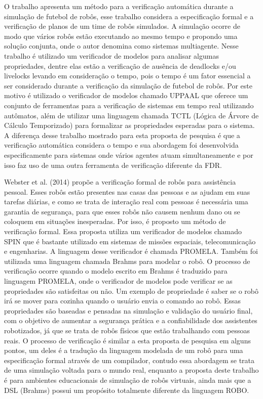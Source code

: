 O trabalho \cite{silva} apresenta um método para a verificação automática durante a simulação de futebol de robôs, esse trabalho considera a especificação formal e a verificação de planos de um time de robôs simulados. A simulação ocorre de modo que vários robôs estão executando ao mesmo tempo e propondo uma solução conjunta, onde o autor denomina como sistemas multiagente. Nesse trabalho é utilizado um verificador de modelos para analisar algumas propriedades, dentre elas estão a verificação de ausência de deadlocks e/ou livelocks levando em consideração o tempo, pois o tempo é um fator essencial a ser considerado durante a verificação da simulação de futebol de robôs.  Por este motivo é utilizado o verificador de modelos chamado UPPAAL que oferece um conjunto de ferramentas para a verificação de sistemas em tempo real utilizando autômatos, além de utilizar uma linguagem chamada TCTL (Lógica de Árvore de Cálculo Temporizado) para formalizar as propriedades esperadas para o sistema. A diferença desse trabalho mostrado para esta proposta de pesquisa é que a verificação automática considera o tempo e sua abordagem foi desenvolvida especificamente para sistemas onde vários agentes atuam simultaneamente e por isso faz uso de uma outra ferramenta de verificação diferente da FDR.
	
Webster et al. (2014) propõe a verificação formal de robôs para assistência pessoal. Esses robôs estão presentes nas casas das pessoas e as ajudam em suas tarefas diárias, e como se trata de interação real com pessoas é necessária uma garantia de segurança, para que esses robôs não causem nenhum dano ou se coloquem em situações inesperadas. Por isso, é proposto um método de verificação formal. Essa proposta utiliza um verificador de modelos chamado SPIN que é bastante utilizado em sistemas de missões espaciais, telecomunicação e engenharias. A linguagem desse verificador é chamada PROMELA. Também foi utilizada uma linguagem chamada Brahms para modelar o robô. O processo de verificação ocorre quando o modelo escrito em Brahms é traduzido para linguagem PROMELA, onde o verificador de modelos pode verificar se as propriedades são satisfeitas ou não. Um exemplo de propriedade é saber se o robô irá se mover para cozinha quando o usuário envia o comando ao robô.  Essas propriedades são baseadas e pensadas na simulação e validação do usuário final, com o objetivo de aumentar a segurança prática e a confiabilidade dos assistentes robotizados, já que se trata de robôs físicos que estão trabalhando com pessoas reais. O processo de verificação é similar a esta proposta de pesquisa em alguns pontos, um deles é a tradução da linguagem modelada de um robô para uma especificação formal através de um compilador, contudo essa abordagem se trata de uma simulação voltada para o mundo real, enquanto a proposta deste trabalho é para ambientes educacionais de simulação de robôs virtuais, ainda mais que a DSL (Brahms) possui um propósito totalmente diferente da linguagem ROBO.

